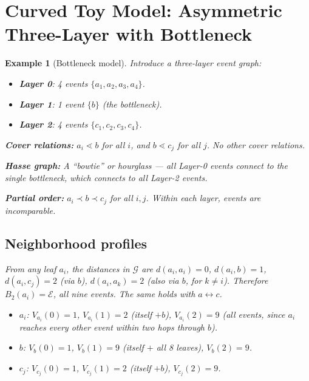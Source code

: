 \documentclass[12pt]{article}
\newtheorem{example}[theorem]{Example}
\newcommand{\Ecal}{\mathcal{E}}
\newcommand{\Gcal}{\mathcal{G}}
\begin{document}
\section{Curved Toy Model: Asymmetric Three-Layer with Bottleneck}\label{sec:curved_toy}

\begin{example}[Bottleneck model]\label{ex:curved}
Introduce a three-layer event graph:
\begin{itemize}
    \item \textbf{Layer 0}: 4 events $\{a_1, a_2, a_3, a_4\}$.
    \item \textbf{Layer 1}: 1 event $\{b\}$ (the bottleneck).
    \item \textbf{Layer 2}: 4 events $\{c_1, c_2, c_3, c_4\}$.
\end{itemize}

\textbf{Cover relations:} $a_i \lessdot b$ for all $i$, and $b \lessdot c_j$ for all $j$. No other cover relations.

\textbf{Hasse graph:} A ``bowtie'' or hourglass --- all Layer-0 events connect to the single bottleneck, which connects to all Layer-2 events.

\textbf{Partial order:} $a_i \prec b \prec c_j$ for all $i, j$. Within each layer, events are incomparable.

\subsection*{Neighborhood profiles}

From any leaf $a_i$, the distances in $\Gcal$ are $d(a_i, a_i) = 0$, $d(a_i, b) = 1$, $d(a_i, c_j) = 2$ (via $b$), $d(a_i, a_k) = 2$ (also via $b$, for $k \neq i$). Therefore $B_2(a_i) = \Ecal$, all nine events. The same holds with $a \leftrightarrow c$.
\begin{itemize}
    \item $a_i$: $V_{a_i}(0) = 1$, $V_{a_i}(1) = 2$ (itself $+ b$), $V_{a_i}(2) = 9$ (all events, since $a_i$ reaches every other event within two hops through $b$).
    \item $b$: $V_b(0) = 1$, $V_b(1) = 9$ (itself $+$ all 8 leaves), $V_b(2) = 9$.
    \item $c_j$: $V_{c_j}(0) = 1$, $V_{c_j}(1) = 2$ (itself $+ b$), $V_{c_j}(2) = 9$.
\end{itemize}


\end{example}
\end{document}
